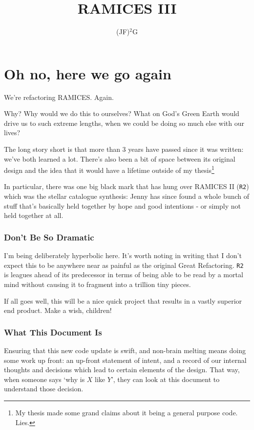\documentclass[a4paper,10pt]{article}
\title{RAMICES III}
\author{(JF)$^2$G}
\begin{document}
\maketitle
	\def\RTwo{\texttt{R2}}
	

		\section*{Oh no, here we go again}

			We're refactoring RAMICES. Again.

			Why? Why would we do this to ourselves? What on God's Green Earth would drive us to such extreme lengths, when we could be doing so much else with our lives?
			
			The long story short is that more than 3 years have passed since it was written: we've both learned a lot. There's also been a bit of space between its original design and the idea that it would have a lifetime outside of my thesis\footnote{My thesis made some grand claims about it being a general purpose code. Lies.}

			In particular, there was one big black mark that has hung over RAMICES II (\RTwo) which was the stellar catalogue synthesis: Jenny has since found a whole bunch of stuff that's basically held together by hope and good intentions - or simply not held together at all. 

			\subsubsection*{Don't Be So Dramatic}

				I'm being deliberately hyperbolic here. It's worth noting in writing that I don't expect this to be anywhere near as painful as the original Great Refactoring. \RTwo{} is leagues ahead of its predecessor in terms of being able to be read by a mortal mind without causing it to fragment into a trillion tiny pieces. 

				If all goes well, this will be a nice quick project that results in a vastly superior end product. Make a wish, children!

				
				
			\subsubsection*{What This Document Is}

				Ensuring that this new code update is swift, and non-brain melting means doing some work up front: an up-front statement of intent, and a record of our internal thoughts and decisions which lead to certain elements of the design. That way, when someone says `why is $X$ like $Y$', they can look at this document to understand those decision.
\end{document}
